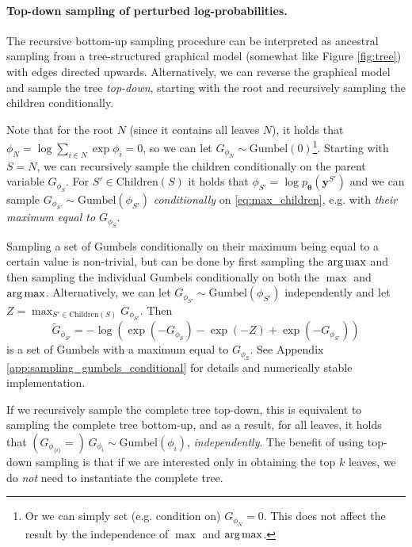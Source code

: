 \paragraph{Top-down sampling of perturbed log-probabilities.}
The recursive bottom-up sampling procedure can be interpreted as ancestral sampling from a tree-structured graphical model (somewhat like Figure \ref{fig:tree}) with edges directed upwards. Alternatively, we can reverse the graphical model and sample the tree \emph{top-down}, starting with the root and recursively sampling the children conditionally. 

Note that for the root $N$ (since it contains all leaves $N$), it holds that $\phi_N = \log \sum_{i \in N} \exp \phi_i = 0$, so we can let $G_{\phi_N} \sim \text{Gumbel}(0)$\footnote{Or we can simply set (e.g. condition on) $G_{\phi_N} = 0$. This does not affect the result by the independence of $\max$ and $\operatorname*{arg\,max}$.}. Starting with $S = N$, we can recursively sample the children conditionally on the parent variable $G_{\phi_S}$. For $S' \in \text{Children}(S)$ it holds that $\phi_{S'} = \log p_{\bm{\theta}}(\bm{y}^{S'})$ and we can sample $G_{\phi_{S'}} \sim \text{Gumbel}(\phi_{S'})$ \emph{conditionally} on \eqref{eq:max_children}, e.g. with \emph{their maximum equal to $G_{\phi_S}$}.

Sampling a set of Gumbels conditionally on their maximum being equal to a certain value is non-trivial, but can be done by first sampling the $\operatorname*{arg\,max}$ and then sampling the individual Gumbels conditionally on both the $\max$ and $\operatorname*{arg\,max}$. Alternatively, we can let $G_{\phi_{S'}} \sim \text{Gumbel}(\phi_{S'})$ independently and let $Z = \max_{S' \in \text{Children}(S)} G_{\phi_{S'}}$. Then
\begin{equation*}
\tilde{G}_{\phi_{S'}} = - \log( \exp( - G_{\phi_S} ) - \exp ( - Z) + \exp ( - G_{\phi_{S'}}) ) \label{eq:trunc_gumb_transform_explicit_main_text}
\end{equation*}
is a set of Gumbels with a maximum equal to $G_{\phi_S}$. See Appendix \ref{app:sampling_gumbels_conditional} for details and numerically stable implementation. 

If we recursively sample the complete tree top-down, this is equivalent to sampling the complete tree bottom-up, and as a result, for all leaves, it holds that $(G_{\phi_{\{i\}}} = ) \, G_{\phi_i} \sim \text{Gumbel}(\phi_i)$, \emph{independently}. The benefit of using top-down sampling is that if we are interested only in obtaining the top $k$ leaves, we do \emph{not} need to instantiate the complete tree.


